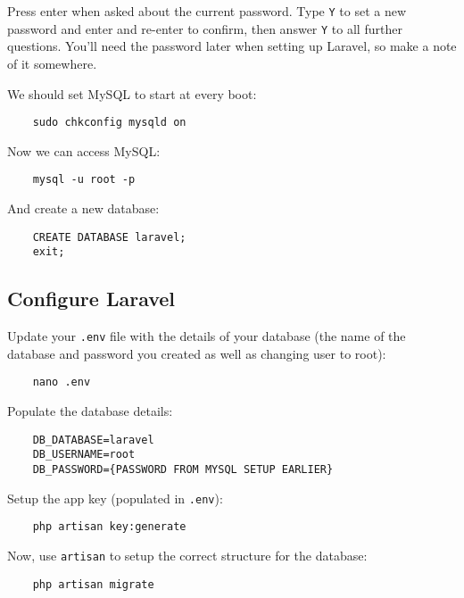Press enter when asked about the current password. Type \texttt{Y} to set a new password and enter and re-enter to confirm, then answer \texttt{Y} to all further questions. You'll need the password later when setting up Laravel, so make a note of it somewhere.

\pagebreak

We should set MySQL to start at every boot:

\begin{verbatim}
    sudo chkconfig mysqld on
\end{verbatim}

Now we can access MySQL:

\begin{verbatim}
    mysql -u root -p
\end{verbatim}

And create a new database:

\begin{verbatim}
    CREATE DATABASE laravel;
    exit;
\end{verbatim}

\subsection{Configure Laravel}

Update your \texttt{.env} file with the details of your database (the name of the database and password you created as well as changing user to root):

\begin{verbatim}
    nano .env
\end{verbatim}

Populate the database details:

\begin{verbatim}
    DB_DATABASE=laravel
    DB_USERNAME=root
    DB_PASSWORD={PASSWORD FROM MYSQL SETUP EARLIER}
\end{verbatim}

Setup the app key (populated in \texttt{.env}):

\begin{verbatim}
    php artisan key:generate
\end{verbatim}

Now, use \texttt{artisan} to setup the correct structure for the database:

\begin{verbatim}
    php artisan migrate
\end{verbatim}

